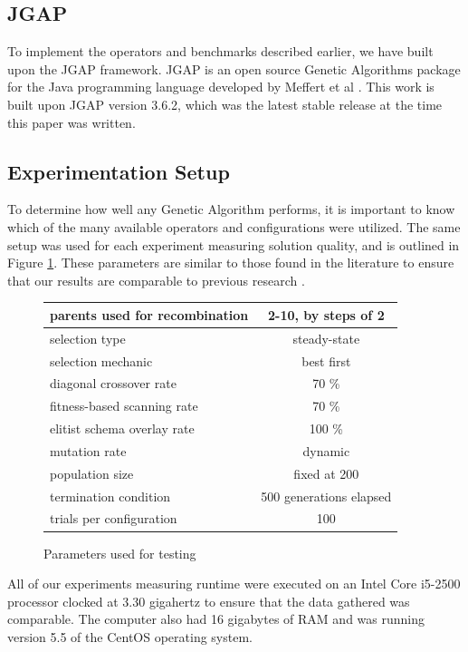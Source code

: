 \subsection*{JGAP}
To implement the operators and benchmarks described earlier, we have built upon the JGAP framework. JGAP is an open source Genetic Algorithms package for the Java programming language developed by Meffert et al \cite{jgap}. This work is built upon JGAP version 3.6.2, which was the latest stable release at the time this paper was written.

\subsection*{Experimentation Setup}

To determine how well any Genetic Algorithm performs, it is important to know which of the many available operators and configurations were utilized. The same setup was used for each experiment measuring solution quality, and is outlined in Figure \ref{fig:GA-config}. These parameters are similar to those found in the literature to ensure that our results are comparable to previous research \cite{Sudholt12, Eiben95, Eiben96}. 

\begin{figure}[h]
\begin{center}
\begin{tabular}{ | l | c | }
\hline
parents used for recombination & 2-10, by steps of 2 \\
\hline
selection type & steady-state \\
\hline
selection mechanic & best first \\
\hline
diagonal crossover rate & 70 \% \\
\hline
fitness-based scanning rate & 70 \% \\
\hline
elitist schema overlay rate & 100 \% \\
\hline
mutation rate & dynamic \cite{Back93} \\
\hline
population size & fixed at 200 \\
\hline
termination condition & 500 generations elapsed \\
\hline
trials per configuration & 100 \\
\hline
\end{tabular}
\caption{Parameters used for testing}
\label{fig:GA-config}
\end{center}
\end{figure}

All of our experiments measuring runtime were executed on an Intel Core i5-2500 processor clocked at 3.30 gigahertz to ensure that the data gathered was comparable. The computer also had 16 gigabytes of RAM and was running version 5.5 of the CentOS operating system. 

